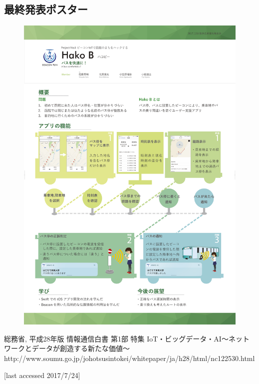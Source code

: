 \documentclass[openany,11pt,papersize]{jsbook}
\begin{document}
\begin{appendix}
\chapter{最終発表ポスター}
\begin{figure}[htbp]
  \begin{center}
    \includegraphics[clip,width=14cm]{img/final_poster.png}
    \label{fig:poster}
  \end{center}
\end{figure}
  
  \end{appendix}
  
  
  
  \begin{thebibliography}{9}
     総務省, 平成28年版 情報通信白書 第1部 特集 IoT・ビッグデータ・AI～ネットワークとデータが創造する新たな価値～
    http://www.soumu.go.jp/johotsusintokei/whitepaper/ja/h28/html/nc122530.html
  
    [last accessed 2017/7/24]
  \end{thebibliography}
  
  
\end{document}
